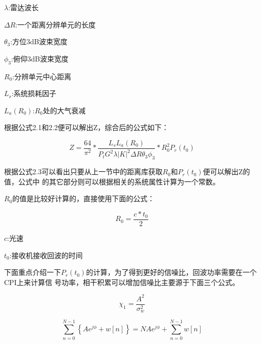 \documentclass[a4paper,12pt]{report}
\begin{document}
\begin{spacing}{1.5}
\begin{proposition}[体散射雷达方程]
    $\lambda$:雷达波长

    $\Delta R$:一个距离分辨单元的长度

    $\theta_3$:方位3dB波束宽度

    $\phi_3$:俯仰3dB波束宽度

    $R_0$:分辨单元中心距离

    $L_s$:系统损耗因子

    $L_a(R_0)$:$R_0$处的大气衰减
\end{proposition}

根据公式2.1和2.2便可以解出Z，综合后的公式如下：
\begin{proposition}[体散射雷达方程]

    \begin{equation}
        Z=\frac{64}{\pi^2}*\frac{L_sL_a\left(R_0\right)}
            {P_tG^2\lambda|K|^2\Delta R\theta_3\phi_3}*R_0^2P_r(t_0)
    \end{equation}

\end{proposition}

根据公式2.3可以看出只要从上一节中的距离库获取$R_0$和$P_r(t_0)$便可以解出Z的值，公式中
的其它部分则可以根据相关的系统属性计算为一个常数。

$R_0$的值是比较好计算的，直接使用下面的公式：
\begin{proposition}[目标距离计算]

    \begin{equation}
        R_0=\frac{c*t_0}{2} 
    \end{equation}

    $c$:光速

    $t_0$:接收机接收回波的时间

\end{proposition}

下面重点介绍一下$P_r(t_0)$的计算，为了得到更好的信噪比，回波功率需要在一个CPI上来计算信
号功率，相干积累可以增加信噪比主要源于下面三个公式。

\begin{proposition}[相干积累]

    \begin{equation}
        \chi_1=\frac{A^2}{\sigma_w^2}
    \end{equation}

    \begin{equation}
        \sum_{n=0}^{N-1}\left\{Ae^{j\phi}+w\left[n\right]\right\}=NAe^{j\phi}+\sum_{n=0}^{N-1}w\left[n\right]
    \end{equation}


\end{proposition}
\end{spacing}
\end{document}

